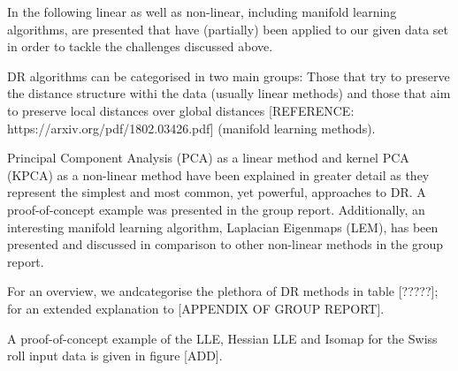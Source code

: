 \documentclass[journal, a4paper]{IEEEtran}
\begin{document}

In the following linear as well as non-linear, including manifold learning algorithms, are presented that have (partially) been applied to our given data set in order to tackle the challenges discussed above.

DR algorithms can be categorised in two main groups: Those that try to preserve the distance structure withi the data (usually linear methods) and those that aim to preserve local distances over global distances [REFERENCE: https://arxiv.org/pdf/1802.03426.pdf] (manifold learning methods).


Principal Component Analysis (PCA) as a linear method and kernel PCA (KPCA) as a non-linear method have been explained in greater detail as they represent the simplest and most common, yet powerful, approaches to DR. A proof-of-concept example was presented in the group report.
Additionally, an interesting manifold learning algorithm, Laplacian Eigenmaps (LEM), has been presented and discussed in comparison to other non-linear methods in the group report.

For an overview, we andcategorise the plethora of DR methods in table [?????]; for an extended explanation to [APPENDIX OF GROUP REPORT].

A proof-of-concept example of the LLE, Hessian LLE and Isomap for the Swiss roll input data is given in figure [ADD].




\end{document}
